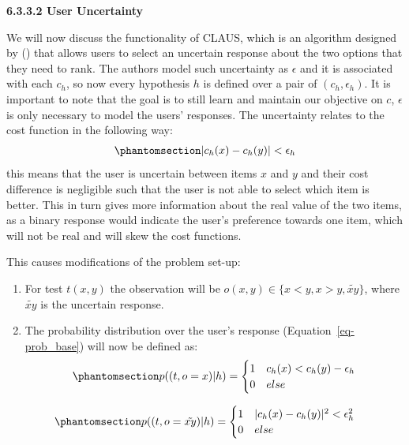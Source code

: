 \documentclass[
  letterpaper,
  numbers=noenddot,
  DIV=11]{scrreprt}
\theoremstyle{definition}
\theoremstyle{plain}
\theoremstyle{plain}
\theoremstyle{remark}
\begin{document}
\textbf{6.3.3.2 User Uncertainty}

We will now discuss the functionality of CLAUS, which is an algorithm
designed by () that allows
users to select an uncertain response about the two options that they
need to rank. The authors model such uncertainty as \(\epsilon\) and it
is associated with each \(c_h\), so now every hypothesis \(h\) is
defined over a pair of \((c_h, \epsilon_h)\). It is important to note
that the goal is to still learn and maintain our objective on \(c\),
\(\epsilon\) is only necessary to model the users' responses. The
uncertainty relates to the cost function in the following way:
\begin{equation}\phantomsection\label{eq-eq3.30}{\begin{aligned}
    |c_h(x) - c_h(y)| < \epsilon_h
\end{aligned}}\end{equation} this means that the user is uncertain
between items \(x\) and \(y\) and their cost difference is negligible
such that the user is not able to select which item is better. This in
turn gives more information about the real value of the two items, as a
binary response would indicate the user's preference towards one item,
which will not be real and will skew the cost functions.

This causes modifications of the problem set-up:

\begin{enumerate}
\def\labelenumi{\arabic{enumi}.}
\item
  For test \(t(x,y)\) the observation will be
  \(o(x,y) \in \{x<y, x>y, \tilde{xy}\}\), where \(\tilde{xy}\) is the
  uncertain response.
\item
  The probability distribution over the user's response
  (Equation~\ref{eq-prob_base}) will now be defined as:
  \begin{equation}\phantomsection\label{eq-eq3.31}{\begin{aligned}
  p((t, o = x) | h) = 
  \begin{cases}
      1 & c_h(x) < c_h(y) - \epsilon_h\\
      0 & else
  \end{cases}
  \end{aligned}}\end{equation}
\end{enumerate}

\begin{equation}\phantomsection\label{eq-eq3.32}{\begin{aligned}
    p((t, o = \tilde{xy}) | h) = 
    \begin{cases}
        1 & |c_h(x) - c_h(y)|^2 < \epsilon_h^2\\
        0 & else
    \end{cases}
\end{aligned}}\end{equation}
\end{document}
